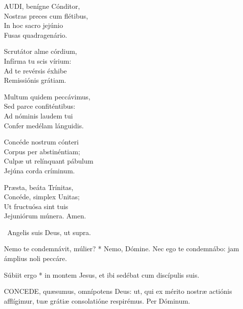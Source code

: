
\lettrine[lines=2]{A}{UDI}, benígne Cónditor,\\
Nostras preces cum flétibus,\\
In hoc sacro jejúnio\\
Fusas quadragenário.

Scrutátor alme córdium,\\
Infírma tu scis vírium:\\
Ad te revérsis éxhibe\\
Remissiónis grátiam.

Multum quidem peccávimus,\\
Sed parce confiténtibus:\\
Ad nóminis laudem tui\\
Confer medélam lánguidis.

Concéde nostrum cónteri\\
Corpus per abstinéntiam;\\
Culpæ ut relínquant pábulum\\
Jejúna corda críminum.


Præsta, beáta Trínitas,\\
Concéde, simplex Unitas;\\
Ut fructuósa sint tuis\\
Jejuniórum múnera. Amen.

\V\ Angelis suis Deus, ut supra.

 Nemo te condemnávit, múlier? * Nemo, Dómine. Nec ego te condemnábo: jam ámplius noli peccáre.


 Súbiit ergo * in montem Jesus, et ibi sedébat cum discípulis suis.


\lettrine[lines=2]{C}{ONCEDE}, quæsumus, omnípotens Deus: ut, qui ex mérito nostræ actiónis afflígimur, tuæ grátiæ consolatióne respirémus. Per Dóminum.

\sectionornament


